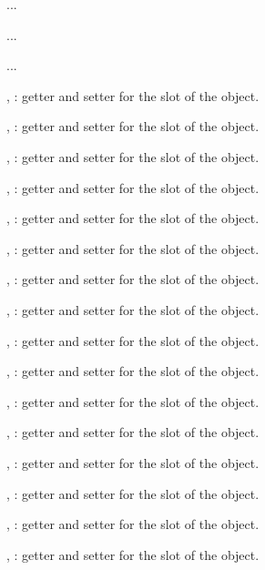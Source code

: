 \documentclass[letterpaper]{book}
\begin{document}
\begin{Description}\relax
...

...

...

, : getter and setter
for the  slot of the object.

, : getter and setter
for the  slot of the object.

, : getter and setter
for the  slot of the object.

, : getter and setter
for the  slot of the object.

, : getter and setter
for the  slot of the object.

, : getter and setter
for the  slot of the object.

, : getter and setter
for the  slot of the object.

, : getter and setter
for the  slot of the object.

, : getter and setter
for the  slot of the object.

, : getter and setter
for the  slot of the object.

, : getter and setter
for the  slot of the object.

, : getter and setter
for the  slot of the object.

, : getter and setter
for the  slot of the object.

, : getter and setter
for the  slot of the object.

, : getter and setter
for the  slot of the object.

, : getter and setter
for the  slot of the object.
\end{Description}
\end{document}
